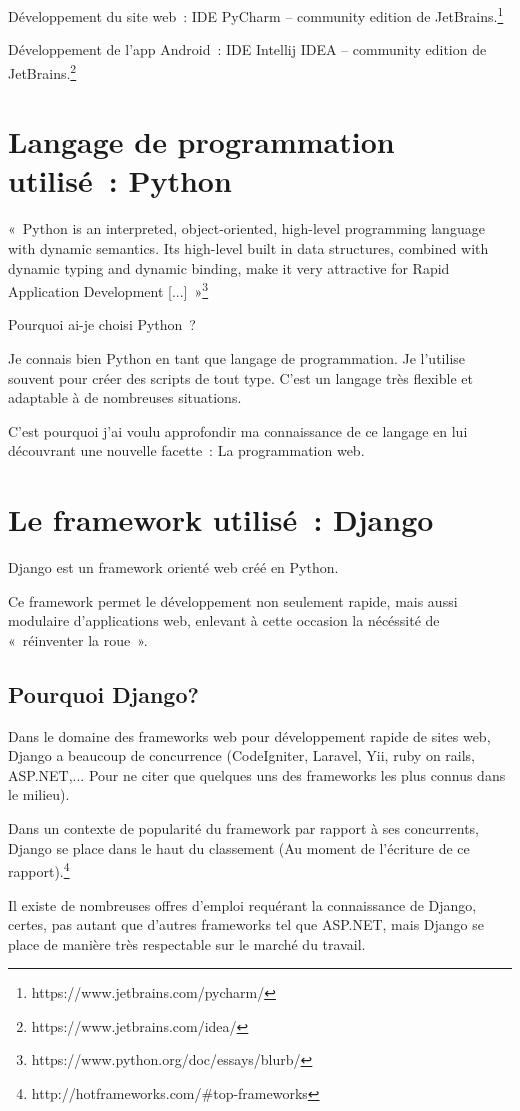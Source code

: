 \documentclass{report}
\begin{document}
Développement du site web : IDE PyCharm – community edition de JetBrains.\footnote{https://www.jetbrains.com/pycharm/}

Développement de l'app Android : IDE Intellij IDEA – community edition de JetBrains.\footnote{https://www.jetbrains.com/idea/}

\section{Langage de programmation utilisé : Python}
« Python is an interpreted, object-oriented, high-level programming language with dynamic semantics. Its high-level built in data structures, combined with dynamic typing and dynamic binding, make it very attractive for Rapid Application Development [...] »\footnote{https://www.python.org/doc/essays/blurb/}

Pourquoi ai-je choisi Python ? 

Je connais bien Python en tant que langage de programmation. Je l'utilise souvent pour créer des scripts de tout type. C'est un langage très flexible et adaptable à de nombreuses situations.

C'est pourquoi j'ai voulu approfondir ma connaissance de ce langage en lui découvrant une nouvelle facette : La programmation web.

\section{Le framework utilisé : Django}
Django est un framework orienté web créé en Python.

Ce framework permet le développement non seulement rapide, mais aussi modulaire d'applications web, enlevant à cette occasion la nécéssité de « réinventer la roue ».

\subsection{Pourquoi Django?}
Dans le domaine des frameworks web pour développement rapide de sites web, Django a beaucoup de concurrence (CodeIgniter, Laravel, Yii, ruby on rails, ASP.NET,... Pour ne citer que quelques uns des frameworks les plus connus dans le milieu).

Dans un contexte de popularité du framework par rapport à ses concurrents, Django se place dans le haut du classement (Au moment de l'écriture de ce rapport).\footnote{http://hotframeworks.com/#top-frameworks}

Il existe de nombreuses offres d'emploi requérant la connaissance de Django, certes, pas autant que d'autres frameworks tel que ASP.NET, mais Django se place de manière très respectable sur le marché du travail.
\end{document}
